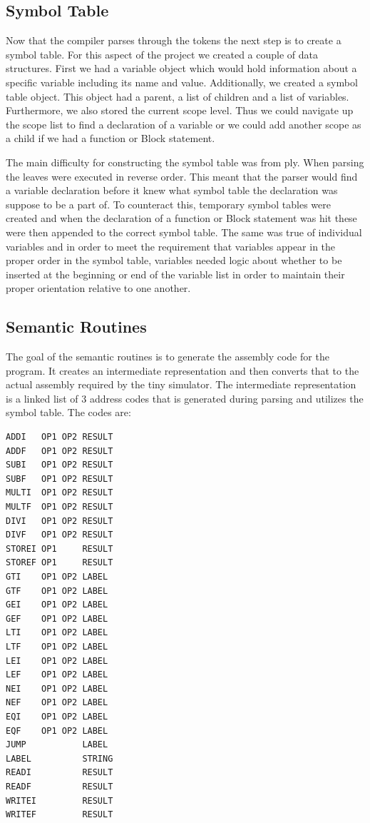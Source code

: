 \documentclass[12pt]{article}
\begin{document}
    	\subsection{Symbol Table}
    		Now that the compiler parses through the tokens the next step is to create a symbol table.  For this aspect of the project we created a couple of data structures.  First we had a variable object which would hold information about a specific variable including its name and value.  Additionally, we created a symbol table object.  This object had a parent, a list of children and a list of variables.  Furthermore, we also stored the current scope level.  Thus we could navigate up the scope list to find a declaration of a variable or we could add another scope as a child if we had a function or Block statement.  
    		
    		The main difficulty for constructing the symbol table was from ply.  When parsing the leaves were executed in reverse order.  This meant that the parser would find a variable declaration before it knew what symbol table the declaration was suppose to be a part of.   To counteract this, temporary symbol tables were created and when the declaration of a function or Block statement was hit these were then appended to the correct symbol table.  The same was true of individual variables and in order to meet the requirement that variables appear in the proper order in the symbol table, variables needed logic about whether to be inserted at the beginning or end of the variable list in order to maintain their proper orientation relative to one another.

    	\subsection{Semantic Routines}
    		The goal of the semantic routines is to generate the assembly code for the program.
            It creates an intermediate representation and then converts that to the actual assembly required by the tiny simulator.
            The intermediate representation is a linked list of 3 address codes that is generated during parsing and utilizes the symbol table.
            The codes are:
            \begin{verbatim}
ADDI   OP1 OP2 RESULT
ADDF   OP1 OP2 RESULT
SUBI   OP1 OP2 RESULT
SUBF   OP1 OP2 RESULT
MULTI  OP1 OP2 RESULT
MULTF  OP1 OP2 RESULT
DIVI   OP1 OP2 RESULT
DIVF   OP1 OP2 RESULT
STOREI OP1     RESULT
STOREF OP1     RESULT
GTI    OP1 OP2 LABEL
GTF    OP1 OP2 LABEL
GEI    OP1 OP2 LABEL
GEF    OP1 OP2 LABEL
LTI    OP1 OP2 LABEL
LTF    OP1 OP2 LABEL
LEI    OP1 OP2 LABEL
LEF    OP1 OP2 LABEL
NEI    OP1 OP2 LABEL
NEF    OP1 OP2 LABEL
EQI    OP1 OP2 LABEL
EQF    OP1 OP2 LABEL
JUMP           LABEL
LABEL          STRING
READI          RESULT
READF          RESULT
WRITEI         RESULT
WRITEF         RESULT
            \end{verbatim}
\end{document}
